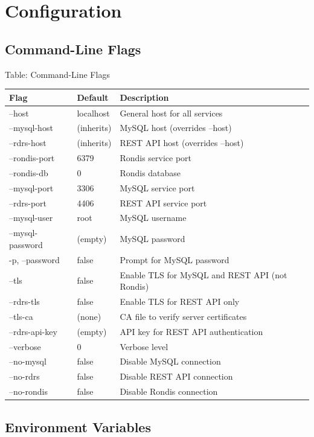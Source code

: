 \documentclass[11pt,a4paper]{report}
\begin{document}
\chapter{Configuration}

\section{Command-Line Flags}

Table: Command-Line Flags

\begin{tabular}{lll}
\toprule
Flag & Default & Description \\
\midrule
--host & localhost & General host for all services \\
--mysql-host & (inherits) & MySQL host (overrides --host) \\
--rdrs-host & (inherits) & REST API host (overrides --host) \\
--rondis-port & 6379 & Rondis service port \\
--rondis-db & 0 & Rondis database \\
--mysql-port & 3306 & MySQL service port \\
--rdrs-port & 4406 & REST API service port \\
--mysql-user & root & MySQL username \\
--mysql-password & (empty) & MySQL password \\
-p, --password & false & Prompt for MySQL password \\
--tls & false & Enable TLS for MySQL and REST API (not Rondis) \\
--rdrs-tls & false & Enable TLS for REST API only \\
--tls-ca & (none) & CA file to verify server certificates \\
--rdrs-api-key & (empty) & API key for REST API authentication \\
--verbose & 0 & Verbose level \\
--no-mysql & false & Disable MySQL connection \\
--no-rdrs & false & Disable REST API connection \\
--no-rondis & false & Disable Rondis connection \\
\bottomrule
\end{tabular}

\section{Environment Variables}
\end{document}
